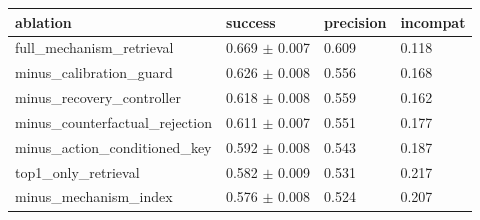 \begin{tabular}{llll}
\toprule
ablation & success & precision & incompat \\
\midrule
full\_mechanism\_retrieval & 0.669 $\pm$ 0.007 & 0.609 & 0.118 \\
minus\_calibration\_guard & 0.626 $\pm$ 0.008 & 0.556 & 0.168 \\
minus\_recovery\_controller & 0.618 $\pm$ 0.008 & 0.559 & 0.162 \\
minus\_counterfactual\_rejection & 0.611 $\pm$ 0.007 & 0.551 & 0.177 \\
minus\_action\_conditioned\_key & 0.592 $\pm$ 0.008 & 0.543 & 0.187 \\
top1\_only\_retrieval & 0.582 $\pm$ 0.009 & 0.531 & 0.217 \\
minus\_mechanism\_index & 0.576 $\pm$ 0.008 & 0.524 & 0.207 \\
\bottomrule
\end{tabular}
